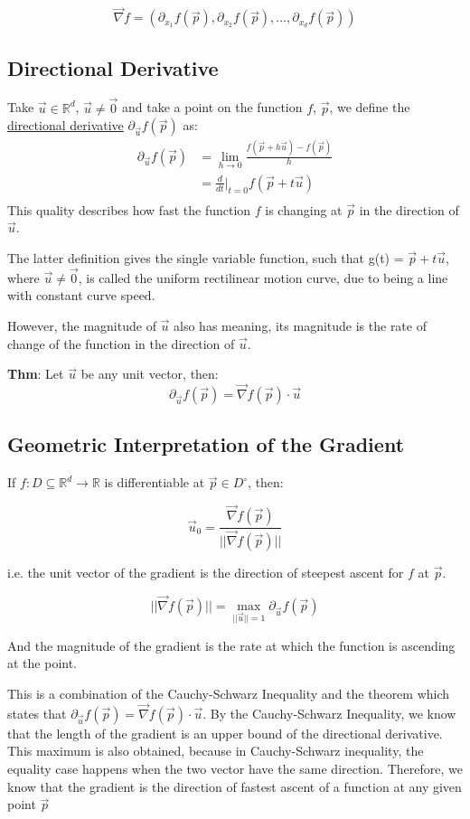 \documentclass[11 pt, twoside]{article}
\begin{document}
$$\vec{\nabla}f = (\partial_{x_1} f(\vec{p}), \partial_{x_2} f(\vec{p}), \dots, \partial_{x_d}f(\vec{p}))$$

\subsection{Directional Derivative}

Take $\vec{u} \in \mathbb{R}^d$, $\vec{u} \neq \vec{0}$ and take a point on the function $f$, $\vec{p}$, we define the \underline{directional derivative}
$\partial_{\vec{u}}f(\vec{p})$ as:
\begin{align*}
\partial_{\vec{u}}f(\vec{p}) &= \lim_{h\to0} \frac{f(\vec{p} + h\vec{u}) - f(\vec{p})}{h}\\
&= \frac{d}{dt}\big|_{t=0} f(\vec{p} + t\vec{u})\\
\end{align*}
This quality describes how fast the function $f$ is changing at $\vec{p}$ in the direction of $\vec{u}$.

The latter definition gives the single variable function, such that g(t) = $\vec{p} + t\vec{u}$, where $\vec{u} \neq \vec{0}$, is called the uniform rectilinear motion curve, due to being a line with constant curve speed.

However, the magnitude of $\vec{u}$ also has meaning, its magnitude is the rate
of change of the function in the direction of $\vec{u}$.

\textbf{Thm}: Let $\vec{u}$ be any unit vector, then:
$$\partial_{\vec{u}}f(\vec{p}) = \vec{\nabla}f(\vec{p}) \cdot \vec{u}$$

\subsection{Geometric Interpretation of the Gradient}
If $f: D \subseteq \mathbb{R}^d \to \mathbb{R}$ is differentiable at
$\vec{p} \in D^\circ$, then:

$$\vec{u}_0 = \frac{\vec{\nabla}f(\vec{p})}{||\vec{\nabla}f(\vec{p})||}$$

i.e. the unit vector of the gradient is the direction of steepest ascent for $f$
at $\vec{p}$.

$$||\vec{\nabla}f(\vec{p})|| = \max_{||\vec{u}|| = 1}
\partial_{\vec{u}}f(\vec{p})$$

And the magnitude of the gradient is the rate at which the function is ascending
at the point.

This is a combination of the Cauchy-Schwarz Inequality and the theorem which states that
$\partial_{\vec{u}}f(\vec{p}) = \vec{\nabla}f(\vec{p}) \cdot \vec{u}$.
By the Cauchy-Schwarz Inequality, we know that the length of the gradient is an
upper bound of the directional derivative. This maximum is also obtained,
because in Cauchy-Schwarz inequality, the equality case happens when the two
vector have the same direction. Therefore, we know that the gradient is the direction of
fastest ascent of a function at any given point $\vec{p}$
\end{document}
